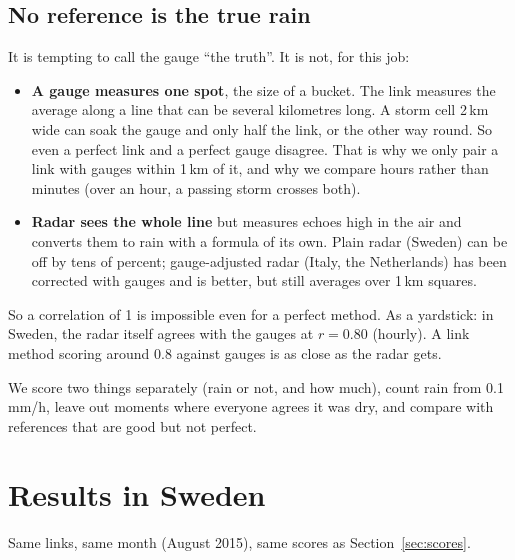 \subsection{No reference is the true rain}
It is tempting to call the gauge ``the truth''. It is not, for this job:
\begin{itemize}
\item \textbf{A gauge measures one spot}, the size of a bucket. The link measures the average along a line that can be
several kilometres long. A storm cell 2\,km wide can soak the gauge and only half the link, or the other way round. So
even a perfect link and a perfect gauge disagree. That is why we only pair a link with gauges within 1\,km of it, and why
we compare hours rather than minutes (over an hour, a passing storm crosses both).
\item \textbf{Radar sees the whole line} but measures echoes high in the air and converts them to rain with a formula of
its own. Plain radar (Sweden) can be off by tens of percent; gauge-adjusted radar (Italy, the Netherlands) has been
corrected with gauges and is better, but still averages over 1\,km squares.
\end{itemize}
So a correlation of 1 is impossible even for a perfect method. As a yardstick: in Sweden, the radar itself agrees with the
gauges at $r = 0.80$ (hourly). A link method scoring around 0.8 against gauges is as close as the radar gets.

\begin{oneline}
We score two things separately (rain or not, and how much), count rain from 0.1\,mm/h, leave out moments where everyone
agrees it was dry, and compare with references that are good but not perfect.
\end{oneline}

\section{Results in Sweden}
\label{sec:se_results}

Same links, same month (August 2015), same scores as Section~\ref{sec:scores}.

